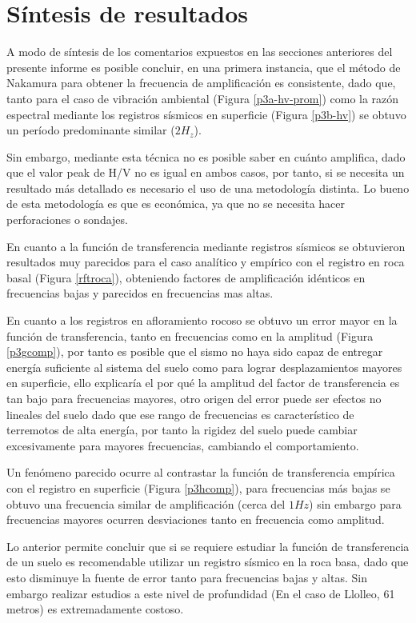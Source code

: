 \newpage
\section{Síntesis de resultados}

A modo de síntesis de los comentarios expuestos en las secciones anteriores del presente informe es posible concluir, en una primera instancia, que el método de Nakamura para obtener la frecuencia de amplificación es consistente, dado que, tanto para el caso de vibración ambiental (Figura \ref{p3a-hv-prom}) como la razón espectral mediante los registros sísmicos en superficie (Figura \ref{p3b-hv}) se obtuvo un período predominante similar ($2H_z$).

\newp Sin embargo, mediante esta técnica no es posible saber en cuánto amplifica, dado que el valor peak de H/V no es igual en ambos casos, por tanto, si se necesita un resultado más detallado es necesario el uso de una metodología distinta. Lo bueno de esta metodología es que es económica, ya que no se necesita hacer perforaciones o sondajes.

\newp En cuanto a la función de transferencia mediante registros sísmicos se obtuvieron resultados muy parecidos para el caso analítico y empírico con el registro en roca basal (Figura \ref{rftroca}), obteniendo factores de amplificación idénticos en frecuencias bajas y parecidos en frecuencias mas altas.

\newp En cuanto a los registros en afloramiento rocoso se obtuvo un error mayor en la función de transferencia, tanto en frecuencias como en la amplitud (Figura \ref{p3gcomp}), por tanto es posible que el sismo no haya sido capaz de entregar energía suficiente al sistema del suelo como para lograr desplazamientos mayores en superficie, ello explicaría el por qué la amplitud del factor de transferencia es tan bajo para frecuencias mayores, otro origen del error puede ser efectos no lineales del suelo dado que ese rango de frecuencias es característico de terremotos de alta energía, por tanto la rigidez del suelo puede cambiar excesivamente para mayores frecuencias, cambiando el comportamiento.

\newp Un fenómeno parecido ocurre al contrastar la función de transferencia empírica con el registro en superficie (Figura \ref{p3hcomp}), para frecuencias más bajas se obtuvo una frecuencia similar de amplificación (cerca del $1Hz$) sin embargo para frecuencias mayores ocurren desviaciones tanto en frecuencia como amplitud.

\newp Lo anterior permite concluir que si se requiere estudiar la función de transferencia de un suelo es recomendable utilizar un registro sísmico en la roca basa, dado que esto disminuye la fuente de error tanto para frecuencias bajas y altas. Sin embargo realizar estudios a este nivel de profundidad (En el caso de Llolleo, 61 metros) es extremadamente costoso.